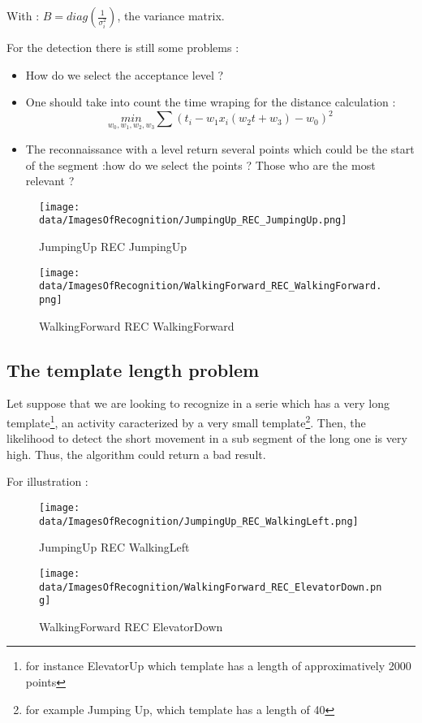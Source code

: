 \documentclass[a4,12pt]{article}
\begin{document}
	With : $B=diag(\frac{1}{\sigma_i^2})$, the variance matrix.
	
	
	For the detection there is still some problems :
	\begin{itemize}
		\item How do we select the acceptance level ?
		\item One should take into count the time wraping for the distance calculation : \[ \underset{w_0,w_1, w_2, w_3}{min} \sum (t_i - w_1 x_i(w_2 t + w_3) - w_0)^2 \]
		\item The reconnaissance with a level return several points which could be the start of the segment :how do we select the points ? Those who are the most relevant ?
	\end{itemize}
	
		\begin{figure}[H]
		\centering
		\texttt{[image: data/ImagesOfRecognition/JumpingUp\_REC\_JumpingUp.png]}
		\caption{JumpingUp REC JumpingUp}
		\label{JumpingUp_REC_JumpingUp}
	\end{figure}
	
	\begin{figure}[H]
		\centering
		\texttt{[image: data/ImagesOfRecognition/WalkingForward\_REC\_WalkingForward.png]}
		\caption{WalkingForward REC WalkingForward}
		\label{JumpingUp_REC_JumpingUp}
	\end{figure}
	
	\subsection{The template length problem} 
	
	Let suppose that we are looking to recognize in a serie which has a very long template\footnote{for instance ElevatorUp which template has a length of approximatively 2000 points}, an activity caracterized by a very small template\footnote{for example Jumping Up, which template has a length of 40}. Then, the likelihood to detect the short movement in a sub segment of the long one is very high. Thus, the algorithm  could return a bad result.
	
	For illustration :
	
	\begin{figure}[H]
		\centering
		\texttt{[image: data/ImagesOfRecognition/JumpingUp\_REC\_WalkingLeft.png]}
		\caption{JumpingUp REC WalkingLeft}
		\label{JumpingUp_REC_JumpingUp}
	\end{figure}
	
	\begin{figure}[H]
		\centering
		\texttt{[image: data/ImagesOfRecognition/WalkingForward\_REC\_ElevatorDown.png]}
		\caption{WalkingForward REC ElevatorDown}
		\label{JumpingUp_REC_JumpingUp}
	\end{figure}
\end{document}

